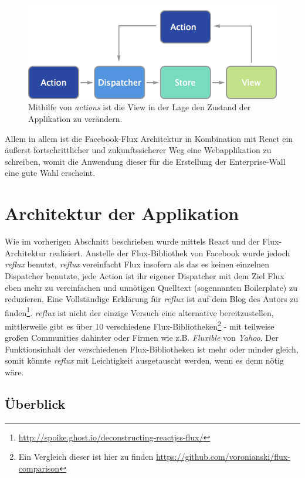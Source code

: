 \documentclass[12pt,twoside]{book}
\begin{document}
\begin{figure}[H]
    \centering
    \includegraphics[width=1.0\textwidth]{images/flux_actions.png}
    \caption{Mithilfe von \textit{actions} ist die View in der Lage den Zustand der Applikation zu verändern.}
    \label{fig:awesome_image}
\end{figure}

Allem in allem ist die Facebook-Flux Architektur in Kombination mit React ein äußerst fortschrittlicher und zukunftssicherer Weg eine Webapplikation zu schreiben, womit die Anwendung dieser für die Erstellung der Enterprise-Wall eine gute Wahl erscheint.

\section*{Architektur der Applikation}

Wie im vorherigen Abschnitt beschrieben wurde mittels React und der Flux-Architektur realisiert. Anstelle der Flux-Bibliothek von Facebook wurde jedoch \textit{reflux} benutzt, \textit{reflux} vereinfacht Flux insofern als das es keinen einzelnen Dispatcher benutzte, jede Action ist ihr eigener Dispatcher mit dem Ziel Flux eben mehr zu vereinfachen und unnötigen Quelltext (sogennanten Boilerplate) zu reduzieren. Eine Vollständige Erklärung für \textit{reflux} ist auf dem Blog des Autors zu finden\footnote{\url{http://spoike.ghost.io/deconstructing-reactjss-flux/}}. \textit{reflux} ist nicht der einzige Versuch eine alternative bereitzustellen, mittlerweile gibt es über 10 verschiedene Flux-Bibliotheken\footnote{Ein Vergleich dieser ist hier zu finden \url{https://github.com/voronianski/flux-comparison}} - mit teilweise großen Communities dahinter oder Firmen wie z.B. \textit{Fluxible} von \textit{Yahoo}. Der Funktionsinhalt der verschiedenen Flux-Bibliotheken ist mehr oder minder gleich, somit könnte \textit{reflux} mit Leichtigkeit ausgetauscht werden, wenn es denn nötig wäre.

\subsection*{Überblick}
\end{document}

